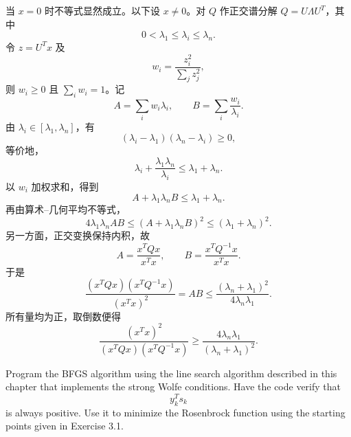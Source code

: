 \documentclass{ctexart}
\begin{document}
\begin{solution}
当 $x=0$ 时不等式显然成立。以下设 $x\neq0$。对 $Q$ 作正交谱分解
$Q=U\Lambda U^T$，其中
\[
    0<\lambda_1\leq\lambda_i\leq\lambda_n.
\]
令 $z=U^Tx$ 及
\[
    w_i=\frac{z_i^2}{\sum_jz_j^2},
\]
则 $w_i\geq0$ 且 $\sum_iw_i=1$。记
\[
    A=\sum_iw_i\lambda_i,
    \qquad B=\sum_i\frac{w_i}{\lambda_i}.
\]
由 $\lambda_i\in[\lambda_1,\lambda_n]$，有
\[
    (\lambda_i-\lambda_1)(\lambda_n-\lambda_i)\geq0,
\]
等价地，
\[
    \lambda_i+\frac{\lambda_1\lambda_n}{\lambda_i}
    \leq\lambda_1+\lambda_n.
\]
以 $w_i$ 加权求和，得到
\[
    A+\lambda_1\lambda_nB\leq\lambda_1+\lambda_n.
\]
再由算术--几何平均不等式，
\[
    4\lambda_1\lambda_nAB
    \leq(A+\lambda_1\lambda_nB)^2
    \leq(\lambda_1+\lambda_n)^2.
\]
另一方面，正交变换保持内积，故
\[
    A=\frac{x^TQx}{x^Tx},
    \qquad B=\frac{x^TQ^{-1}x}{x^Tx}.
\]
于是
\[
    \frac{(x^TQx)(x^TQ^{-1}x)}{(x^Tx)^2}
    =AB
    \leq\frac{(\lambda_n+\lambda_1)^2}
                   {4\lambda_n\lambda_1}.
\]
所有量均为正，取倒数便得
\[
    \boxed{
    \frac{(x^Tx)^2}{(x^TQx)(x^TQ^{-1}x)}
    \geq\frac{4\lambda_n\lambda_1}
                   {(\lambda_n+\lambda_1)^2}.}
\]
\end{solution}

\begin{problem}[3.9]
Program the BFGS algorithm using the line search algorithm described in this
chapter that implements the strong Wolfe conditions. Have the code verify that
\[
    y_k^Ts_k
\]
is always positive. Use it to minimize the Rosenbrock function using the
starting points given in Exercise 3.1.
\end{problem}
\end{document}
